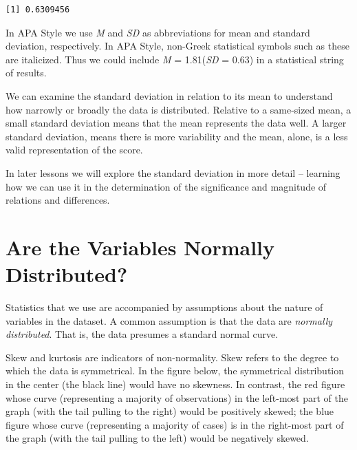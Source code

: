 \documentclass[
  11pt,
]{book}
\newenvironment{Shaded}{\begin{snugshade}}{\end{snugshade}}
\newcommand{\CommentTok}[1]{\textcolor[rgb]{0.56,0.35,0.01}{\textit{#1}}}
\newcommand{\FunctionTok}[1]{\textcolor[rgb]{0.00,0.00,0.00}{#1}}
\newcommand{\NormalTok}[1]{#1}
\newcommand{\SpecialCharTok}[1]{\textcolor[rgb]{0.00,0.00,0.00}{#1}}
\begin{document}
\begin{Shaded}
\end{Shaded}

\begin{verbatim}
[1] 0.6309456
\end{verbatim}

In APA Style we use \emph{M} and \emph{SD} as abbreviations for mean and standard deviation, respectively. In APA Style, non-Greek statistical symbols such as these are italicized. Thus we could include \emph{M} = 1.81(\emph{SD} = 0.63) in a statistical string of results.

We can examine the standard deviation in relation to its mean to understand how narrowly or broadly the data is distributed. Relative to a same-sized mean, a small standard deviation means that the mean represents the data well. A larger standard deviation, means there is more variability and the mean, alone, is a less valid representation of the score.

In later lessons we will explore the standard deviation in more detail -- learning how we can use it in the determination of the significance and magnitude of relations and differences.

\hypertarget{are-the-variables-normally-distributed}{%
\section{Are the Variables Normally Distributed?}\label{are-the-variables-normally-distributed}}

Statistics that we use are accompanied by assumptions about the nature of variables in the dataset. A common assumption is that the data are \emph{normally distributed}. That is, the data presumes a standard normal curve.

Skew and kurtosis are indicators of non-normality. Skew refers to the degree to which the data is symmetrical. In the figure below, the symmetrical distribution in the center (the black line) would have no skewness. In contrast, the red figure whose curve (representing a majority of observations) in the left-most part of the graph (with the tail pulling to the right) would be positively skewed; the blue figure whose curve (representing a majority of cases) is in the right-most part of the graph (with the tail pulling to the left) would be negatively skewed.
\end{document}

